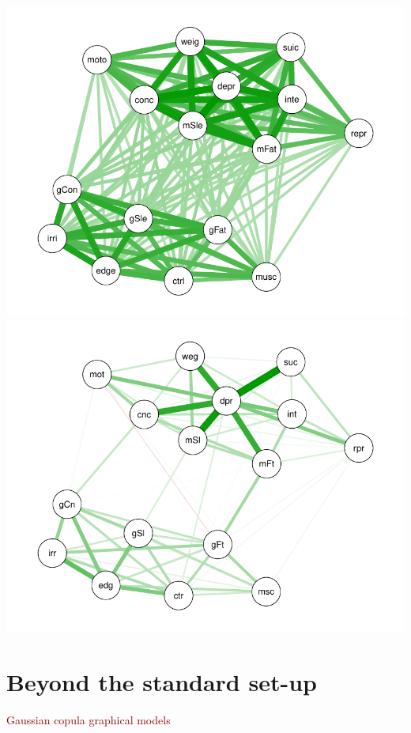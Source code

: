 \documentclass[11pt,handout,aspectratio=169,dvipsnames]{beamer}
\begin{document}
\begin{frame}[label=depr_lasso]{}
	\begin{center}
		\includegraphics[scale=.5]{pics/depr_corr}\includegraphics[scale=.5]{pics/depr_lasso}
	\end{center}
\end{frame}


\section{Beyond the standard set-up}

\begin{frame}{}
\begin{center}
	{\Huge \textcolor{DarkRed}{Gaussian copula graphical models}}
\end{center}
\end{frame}
\end{document}

